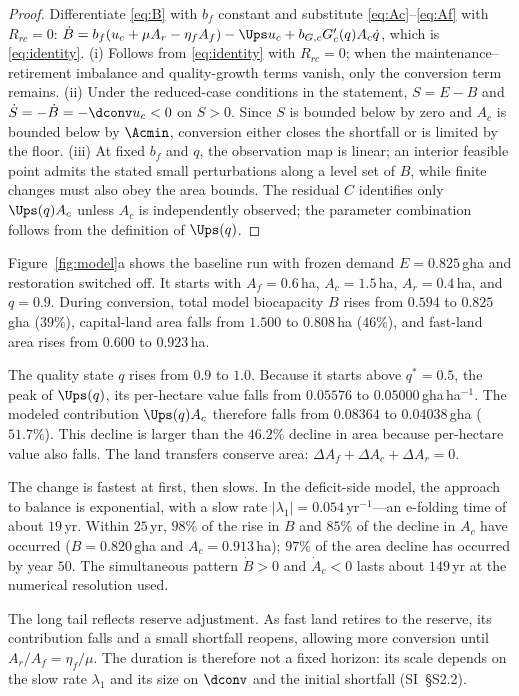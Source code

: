 \begin{proof}
Differentiate \eqref{eq:B} with $b_f$ constant and substitute \eqref{eq:Ac}--\eqref{eq:Af} with $R_{rc}=0$: $\dot B=b_f(u_c+\mu A_r-\eta_fA_f)-\Ups u_c+b_{G,c}G_c'(q)A_c\dot q$, which is \eqref{eq:identity}. (i) Follows from \eqref{eq:identity} with $R_{rc}=0$; when the maintenance--retirement imbalance and quality-growth terms vanish, only the conversion term remains. (ii) Under the reduced-case conditions in the statement, $S=E-B$ and $\dot S=-\dot B=-\dconv u_c<0$ on $S>0$. Since $S$ is bounded below by zero and $A_c$ is bounded below by $\Acmin$, conversion either closes the shortfall or is limited by the floor. (iii) At fixed $b_f$ and $q$, the observation map is linear; an interior feasible point admits the stated small perturbations along a level set of $B$, while finite changes must also obey the area bounds. The residual $C$ identifies only $\Ups(q)A_c$ unless $A_c$ is independently observed; the parameter combination follows from the definition of $\Ups(q)$.
\end{proof}

Figure~\ref{fig:model}a shows the baseline run with frozen demand $E=0.825$\,gha and restoration switched off. It starts with $A_f=0.6$\,ha, $A_c=1.5$\,ha, $A_r=0.4$\,ha, and $q=0.9$. During conversion, total model biocapacity $B$ rises from $0.594$ to $0.825$\,gha ($39\%$), capital-land area falls from $1.500$ to $0.808$\,ha ($46\%$), and fast-land area rises from $0.600$ to $0.923$\,ha.

The quality state $q$ rises from $0.9$ to $1.0$. Because it starts above $q^*=0.5$, the peak of $\Ups(q)$, its per-hectare value falls from $0.05576$ to $0.05000$\,gha\,ha$^{-1}$. The modeled contribution $\Ups(q)A_c$ therefore falls from $0.08364$ to $0.04038$\,gha ($51.7\%$). This decline is larger than the $46.2\%$ decline in area because per-hectare value also falls. The land transfers conserve area: $\Delta A_f+\Delta A_c+\Delta A_r=0$.

The change is fastest at first, then slows. In the deficit-side model, the approach to balance is exponential, with a slow rate $|\lambda_1|=0.054$\,yr$^{-1}$—an e-folding time of about $19$\,yr. Within $25$\,yr, $98\%$ of the rise in $B$ and $85\%$ of the decline in $A_c$ have occurred ($B=0.820$\,gha and $A_c=0.913$\,ha); $97\%$ of the area decline has occurred by year $50$. The simultaneous pattern $\dot B>0$ and $\dot A_c<0$ lasts about $149$\,yr at the numerical resolution used.

The long tail reflects reserve adjustment. As fast land retires to the reserve, its contribution falls and a small shortfall reopens, allowing more conversion until $A_r/A_f=\eta_f/\mu$. The duration is therefore not a fixed horizon: its scale depends on the slow rate $\lambda_1$ and its size on $\dconv$ and the initial shortfall (SI~\S S2.2).

